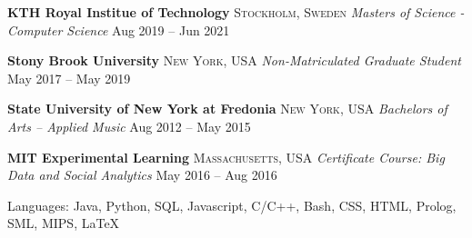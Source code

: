 \documentclass[10pt,letterpaper]{article}
\begin{document}
\headedsection 
{\textbf{KTH Royal Institue of Technology}}
{\textsc{Stockholm, Sweden}} {														
	\headedsubsection
	{\textit{Masters of Science - Computer Science}}
	{Aug 2019 -- Jun 2021}
	{\bodytext{}}
}
\vspace{-5mm}


\headedsection 
{\textbf{Stony Brook University}}
{\textsc{New York, USA}} {														
	\headedsubsection
	{\textit{Non-Matriculated Graduate Student}}
	{May 2017 -- May 2019}
	{\bodytext{}}
}
\vspace{-5mm}


\headedsection
{\textbf{State University of New York at Fredonia}}
{\textsc{New York, USA}} {															
	\headedsubsection
	{\textit{Bachelors of Arts -- Applied Music}}
	{Aug 2012 -- May 2015}
	{\bodytext{}}
}
\vspace{-5mm}


\headedsection 
{\textbf{MIT Experimental Learning}}
{\textsc{Massachusetts, USA}} {
	\headedsubsection 
	{\textit{Certificate Course: Big Data and Social Analytics}}
	{May 2016 -- Aug 2016}
	{\bodytext{}}
}



\spacedhrule{-0.6em}{-0.7em} 







										
\inlineheadsection 
{Languages:}
{Java, Python, SQL, Javascript, C/C++, Bash, CSS, HTML, Prolog, SML, MIPS, {\LaTeX}}
\vspace{0.5em}
										
										
\end{document}
